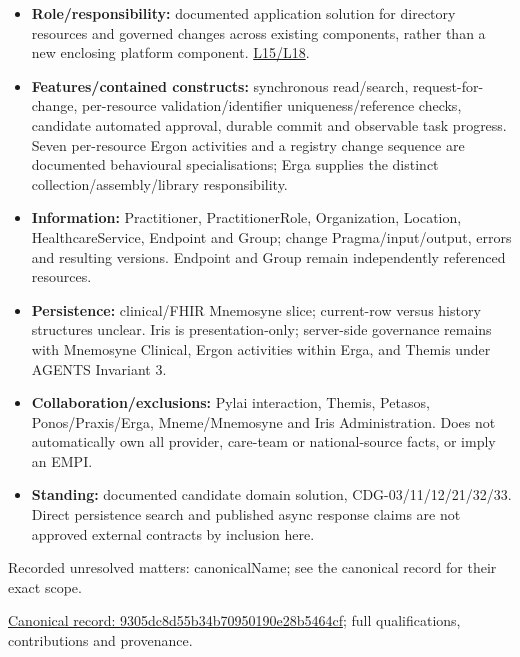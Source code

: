\begin{itemize}


\item \textbf{Role/responsibility:} documented application solution for directory resources
  and governed changes across existing components, rather than a new enclosing
  platform component. \href{\detokenize{../../../../../docs/markdown/05-information-systems-architecture/sources.md#l15}}{L15/L18}.

\item \textbf{Features/contained constructs:} synchronous read/search, request-for-change,
  per-resource validation/identifier uniqueness/reference checks, candidate automated
  approval, durable commit and observable task progress. Seven per-resource Ergon
  activities and a registry change sequence are documented behavioural specialisations;
  Erga supplies the distinct collection/assembly/library responsibility.

\item \textbf{Information:} Practitioner, PractitionerRole, Organization, Location,
  HealthcareService, Endpoint and Group; change Pragma/input/output, errors and
  resulting versions. Endpoint and Group remain independently referenced resources.

\item \textbf{Persistence:} clinical/FHIR Mnemosyne slice; current-row versus history
  structures unclear. Iris is presentation-only; server-side governance remains
  with Mnemosyne Clinical, Ergon activities within Erga, and Themis under
  AGENTS Invariant 3.

\item \textbf{Collaboration/exclusions:} Pylai interaction, Themis, Petasos, Ponos/Praxis/Erga,
  Mneme/Mnemosyne and Iris Administration. Does not automatically own all provider,
  care-team or national-source facts, or imply an EMPI.

\item \textbf{Standing:} documented candidate domain solution, CDG-03/11/12/21/32/33.
  Direct persistence search and published async response claims are not approved
  external contracts by inclusion here.

\end{itemize}

{\small Recorded unresolved matters: canonicalName; see the canonical record for their exact scope.}\par
{\footnotesize \href{../../../../continuum/application/application-collaboration/9305dc8d55b34b70950190e28b5464cf.md}{Canonical record: 9305dc8d55b34b70950190e28b5464cf}; full qualifications, contributions and provenance.}\par
